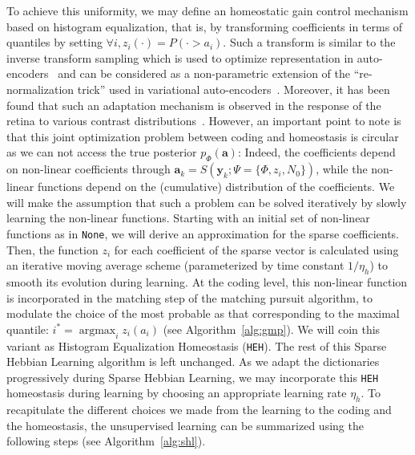 \documentclass[draft]{article} %
\DeclareMathOperator*{\ArgMax}{\arg\max}   %
\newcommand{\coef}{\mathbf{a}} %
\newcommand{\image}{\mathbf{y}} %
\newcommand{\dico}{\Phi} %
\begin{document}
To achieve this uniformity, we may define an homeostatic gain control mechanism based on histogram equalization, that is, by transforming coefficients in terms of quantiles by setting $\forall i, z_i(\cdot) = P( \cdot > a_i)$. Such a transform is similar to the inverse transform sampling which is used to optimize representation in auto-encoders~\citep{Doersch2016} and can be considered as a non-parametric extension of the ``re-normalization trick'' used in variational auto-encoders~\citep{Kingma13}. %
Moreover, it has been found that such an adaptation mechanism is observed in the response of the retina to various contrast distributions~\citep{Laughlin81}. However, an important point to note is that this joint optimization problem between coding and homeostasis is circular as we can not access the true posterior $p_\dico(\coef)$: Indeed, the coefficients depend on non-linear coefficients through $\coef_{k} = S(\image_k; \Psi=\{\dico, z_i, N_0\})$, while the non-linear functions depend on the (cumulative) distribution of the coefficients. We will make the assumption that such a problem can be solved iteratively by slowly learning the non-linear functions. Starting with an initial set of non-linear functions as in \texttt{None}, we will derive an approximation for the sparse coefficients. Then, the function $z_i$ for each coefficient of the sparse vector is calculated using an iterative moving average scheme (parameterized by time constant $1/\eta_h$) to smooth its evolution during learning. At the coding level, this non-linear function is incorporated in the matching step of the matching pursuit algorithm, to modulate the choice of the most probable as that corresponding to the maximal quantile: $i^\ast = \ArgMax_i z_i(a_i)$ (see Algorithm~\ref{alg:gmp}). We will coin this variant as Histogram Equalization Homeostasis (\texttt{HEH}). The rest of this Sparse Hebbian Learning algorithm is left unchanged. As we adapt the dictionaries progressively during Sparse Hebbian Learning, we may incorporate this \texttt{HEH} homeostasis during learning by choosing an appropriate learning rate $\eta_h$.
To recapitulate the different choices we made from the learning to the coding and the homeostasis, the unsupervised learning can be summarized using the following steps (see Algorithm~\ref{alg:shl}).
\end{document}
